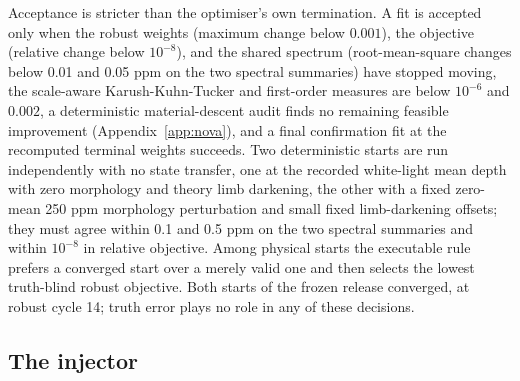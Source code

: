 Acceptance is stricter than the optimiser's own termination. A fit is
accepted only when the robust weights (maximum change below $0.001$), the
objective (relative change below $10^{-8}$), and the shared spectrum
(root-mean-square changes below 0.01 and 0.05 ppm on the two spectral
summaries) have stopped moving, the scale-aware Karush-Kuhn-Tucker and
first-order measures are below $10^{-6}$ and $0.002$, a deterministic
material-descent audit finds no remaining feasible improvement
(Appendix~\ref{app:nova}), and a final confirmation fit at the recomputed
terminal weights succeeds. Two deterministic starts are run independently
with no state transfer, one at the recorded white-light mean depth with
zero morphology and theory limb darkening, the other with a fixed
zero-mean 250 ppm morphology perturbation and small fixed limb-darkening
offsets; they must agree within 0.1 and 0.5 ppm on the two spectral
summaries and within $10^{-8}$ in relative objective. Among physical
starts the executable rule prefers a converged start over a merely valid
one and then selects the lowest truth-blind robust objective. Both starts
of the frozen release converged, at robust cycle 14; truth error plays no
role in any of these decisions.

\subsection{The injector}


